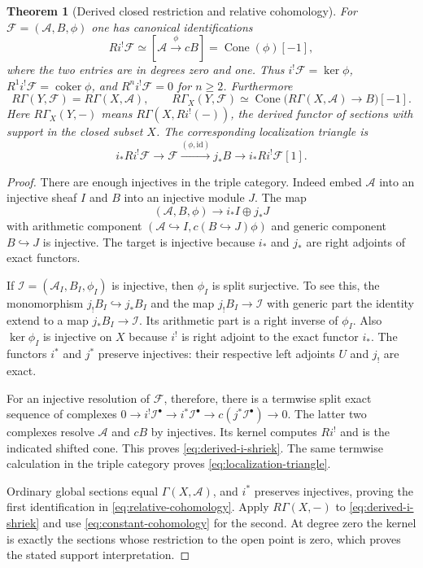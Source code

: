 \documentclass[11pt,a4paper]{article}
\newtheorem{theorem}{Theorem}[section]
\theoremstyle{definition}\newtheorem{definition}[theorem]{Definition}
\providecommand{\coker}{\operatorname{coker}}
\begin{document}
\begin{theorem}[Derived closed restriction and relative cohomology]
\label{thm:derived}
For $\mathcal F=(\mathcal A,B,\phi)$ one has canonical identifications
\[
 Ri^!\mathcal F\simeq
 [\mathcal A\xrightarrow{\phi}cB]
 =\operatorname{Cone}(\phi)[-1],
 \tag{RP7}\label{eq:derived-i-shriek}
\]
where the two entries are in degrees zero and one. Thus
$i^!\mathcal F=\ker\phi$, $R^1i^!\mathcal F=\coker\phi$, and
$R^ni^!\mathcal F=0$ for $n\ge2$.
Furthermore
\[
 R\Gamma(Y,\mathcal F)=R\Gamma(X,\mathcal A),\qquad
 R\Gamma_X(Y,\mathcal F)
 \simeq\operatorname{Cone}\bigl(R\Gamma(X,\mathcal A)\to B\bigr)[-1].
 \tag{RP8}\label{eq:relative-cohomology}
\]
Here $R\Gamma_X(Y,-)$ means $R\Gamma(X,Ri^!(-))$, the derived functor
of sections with support in the closed subset $X$. The corresponding
localization triangle is
\[
 i_*Ri^!\mathcal F\longrightarrow\mathcal F
 \xrightarrow{(\phi,\mathrm{id})}j_*B\longrightarrow i_*Ri^!\mathcal F[1].
 \tag{RP9}\label{eq:localization-triangle}
\]
\end{theorem}
\begin{proof}
There are enough injectives in the triple category. Indeed embed
$\mathcal A$ into an injective sheaf $I$ and $B$ into an injective
module $J$. The map
\[
 (\mathcal A,B,\phi)\longrightarrow i_*I\oplus j_*J
\]
with arithmetic component $(\mathcal A\hookrightarrow I,c(B\hookrightarrow
J)\phi)$ and generic component $B\hookrightarrow J$ is injective.
The target is injective because $i_*$ and $j_*$ are right adjoints
of exact functors.

If $\mathcal I=(\mathcal A_I,B_I,\phi_I)$ is injective, then
$\phi_I$ is split surjective. To see this, the monomorphism
$j_!B_I\hookrightarrow j_*B_I$ and the map $j_!B_I\to\mathcal I$
with generic part the identity extend to a map $j_*B_I\to\mathcal I$.
Its arithmetic part is a right inverse of $\phi_I$. Also
$\ker\phi_I$ is injective on $X$ because $i^!$ is right adjoint to the
exact functor $i_*$. The functors $i^*$ and $j^*$ preserve injectives:
their respective left adjoints $U$ and $j_!$ are exact.

For an injective resolution of $\mathcal F$, therefore, there is a
termwise split exact sequence of complexes
$0\to i^!\mathcal I^\bullet\to i^*\mathcal I^\bullet
\to c(j^*\mathcal I^\bullet)\to0$. The latter two complexes resolve
$\mathcal A$ and $cB$ by injectives. Its kernel computes $Ri^!$ and
is the indicated shifted cone. This proves \eqref{eq:derived-i-shriek}.
The same termwise calculation in the triple category proves
\eqref{eq:localization-triangle}.

Ordinary global sections equal $\Gamma(X,\mathcal A)$, and $i^*$
preserves injectives, proving the first identification in
\eqref{eq:relative-cohomology}. Apply $R\Gamma(X,-)$ to
\eqref{eq:derived-i-shriek} and use
\eqref{eq:constant-cohomology} for the second. At degree zero the
kernel is exactly the sections whose restriction to the open point
is zero, which proves the stated support interpretation.
\end{proof}
\end{document}
